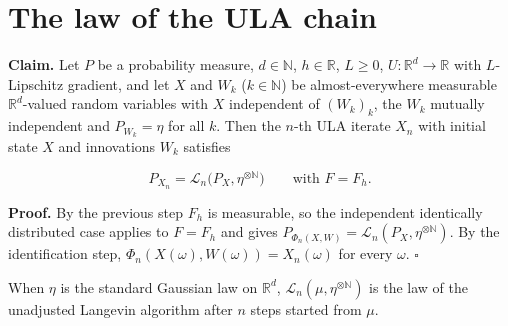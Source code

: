 \documentclass[11pt,a4paper]{article}
\begin{document}
\section{\texorpdfstring{The law of the ULA chain}{The law of the ULA chain}}


\textbf{Claim.} Let \(P\) be a probability measure, \(d\in\mathbb N\), \(h\in\mathbb R\), \(L\ge0\), \(U:\mathbb R^d\to\mathbb R\) with \(L\)-Lipschitz gradient, and let \(X\) and \(W_k\) (\(k\in\mathbb N\)) be almost-everywhere measurable \(\mathbb R^d\)-valued random variables with \(X\) independent of \((W_k)_k\), the \(W_k\) mutually independent and \(P_{W_k}=\eta\) for all \(k\). Then the \(n\)-th ULA iterate \(X_n\) with initial state \(X\) and innovations \(W_k\) satisfies


\[P_{X_n}=\mathcal L_n\bigl(P_X,\eta^{\otimes\mathbb N}\bigr)\qquad\text{with }F=F_h.\]


\textbf{Proof.} By the previous step \(F_h\) is measurable, so the independent identically distributed case applies to \(F=F_h\) and gives \(P_{\Phi_n(X,W)}=\mathcal L_n(P_X,\eta^{\otimes\mathbb N})\). By the identification step, \(\Phi_n(X(\omega),W(\omega))=X_n(\omega)\) for every \(\omega\). \(\square\)




When \(\eta\) is the standard Gaussian law on \(\mathbb R^d\), \(\mathcal L_n(\mu,\eta^{\otimes\mathbb N})\) is the law of the unadjusted Langevin algorithm after \(n\) steps started from \(\mu\).
\end{document}
